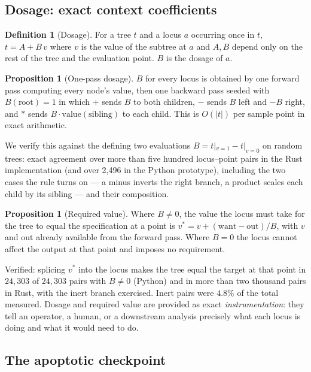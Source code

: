 \documentclass[11pt,a4paper]{article}
\theoremstyle{definition}
\newtheorem{definition}[theorem]{Definition}
\newtheorem{proposition}[theorem]{Proposition}
\theoremstyle{remark}
\begin{document}
\subsection{Dosage: exact context coefficients}

\begin{definition}[Dosage]
For a tree $t$ and a locus $a$ occurring once in $t$, $t = A + B\,v$ where $v$ is
the value of the subtree at $a$ and $A,B$ depend only on the rest of the tree and
the evaluation point. $B$ is the dosage of $a$.
\end{definition}

\begin{proposition}[One-pass dosage]
$B$ for every locus is obtained by one forward pass computing every node's value,
then one backward pass seeded with $B(\text{root}) = 1$ in which $+$ sends $B$ to
both children, $-$ sends $B$ left and $-B$ right, and $*$ sends
$B\cdot\text{value}(\text{sibling})$ to each child. This is $O(|t|)$ per sample
point in exact arithmetic.
\end{proposition}

We verify this against the defining two evaluations $B = t|_{v=1} - t|_{v=0}$ on
random trees: exact agreement over more than five hundred locus--point pairs in
the Rust implementation (and over 2{,}496 in the Python prototype), including the
two cases the rule turns on --- a minus inverts the right branch, a product
scales each child by its sibling --- and their composition.

\begin{proposition}[Required value]
Where $B \neq 0$, the value the locus must take for the tree to equal the
specification at a point is $v^* = v + (\text{want} - \text{out})/B$, with $v$
and $\text{out}$ already available from the forward pass. Where $B = 0$ the locus
cannot affect the output at that point and imposes no requirement.
\end{proposition}

Verified: splicing $v^*$ into the locus makes the tree equal the target at that
point in $24{,}303$ of $24{,}303$ pairs with $B\neq 0$ (Python) and in more than
two thousand pairs in Rust, with the inert branch exercised. Inert pairs were
$4.8\%$ of the total measured. Dosage and required value are provided as exact
\emph{instrumentation}: they tell an operator, a human, or a downstream analysis
precisely what each locus is doing and what it would need to do.

\subsection{The apoptotic checkpoint}
\end{document}
